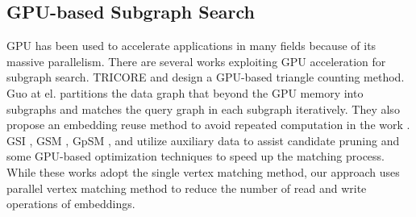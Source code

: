 \subsection{GPU-based Subgraph Search}
GPU has been used to accelerate applications in many fields because of its massive parallelism. There are several works exploiting GPU acceleration for subgraph search. TRICORE \cite{hu2018tricore}  and \cite{green2014fast} design a GPU-based triangle counting method. Guo at el. \cite{guo2020gpu} partitions the data graph that beyond the GPU memory into subgraphs and matches the query graph in each subgraph iteratively. They also propose an embedding reuse method to avoid repeated computation in the work \cite{guo2020exploiting}. GSI \cite{zeng2020gsi}, GSM \cite{wang2020fast}, GpSM \cite{tran2015fast}, and \cite{lin2016network} utilize auxiliary data to assist candidate pruning and some GPU-based optimization techniques to speed up the matching process. While these works adopt the single vertex matching method, our approach uses parallel vertex matching method to reduce the number of read and write operations of  embeddings.

